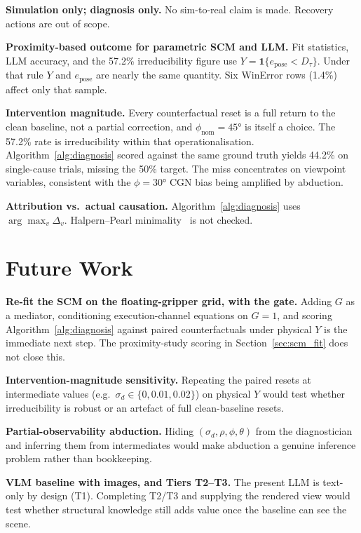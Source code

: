 \documentclass[11pt,a4paper]{report}
\begin{document}
\textbf{Simulation only; diagnosis only.} No sim-to-real claim is made. Recovery actions are out of scope.

\textbf{Proximity-based outcome for parametric SCM and LLM.} Fit statistics, LLM accuracy, and the 57.2\% irreducibility figure use $Y = \mathbf{1}\{e_{\text{pose}} < D_\tau\}$. Under that rule $Y$ and $e_{\text{pose}}$ are nearly the same quantity. Six WinError rows (1.4\%) affect only that sample.

\textbf{Intervention magnitude.} Every counterfactual reset is a full return to the clean baseline, not a partial correction, and $\phi_{\text{nom}} = 45°$ is itself a choice. The 57.2\% rate is irreducibility within that operationalisation. Algorithm~\ref{alg:diagnosis} scored against the same ground truth yields 44.2\% on single-cause trials, missing the 50\% target. The miss concentrates on viewpoint variables, consistent with the $\phi = 30°$ CGN bias being amplified by abduction.

\textbf{Attribution vs.\ actual causation.} Algorithm~\ref{alg:diagnosis} uses $\arg\max_v \Delta_v$. Halpern--Pearl minimality~\cite{halpern2005causes} is not checked.


\section{Future Work}
\label{sec:future_work}

\textbf{Re-fit the SCM on the floating-gripper grid, with the gate.} Adding $G$ as a mediator, conditioning execution-channel equations on $G=1$, and scoring Algorithm~\ref{alg:diagnosis} against paired counterfactuals under physical $Y$ is the immediate next step. The proximity-study scoring in Section~\ref{sec:scm_fit} does not close this.

\textbf{Intervention-magnitude sensitivity.} Repeating the paired resets at intermediate values (e.g.\ $\sigma_d \in \{0, 0.01, 0.02\}$) on physical $Y$ would test whether irreducibility is robust or an artefact of full clean-baseline resets.

\textbf{Partial-observability abduction.} Hiding $(\sigma_d, \rho, \phi, \theta)$ from the diagnostician and inferring them from intermediates would make abduction a genuine inference problem rather than bookkeeping.

\textbf{VLM baseline with images, and Tiers T2--T3.} The present LLM is text-only by design (T1). Completing T2/T3 and supplying the rendered view would test whether structural knowledge still adds value once the baseline can see the scene.
\end{document}
